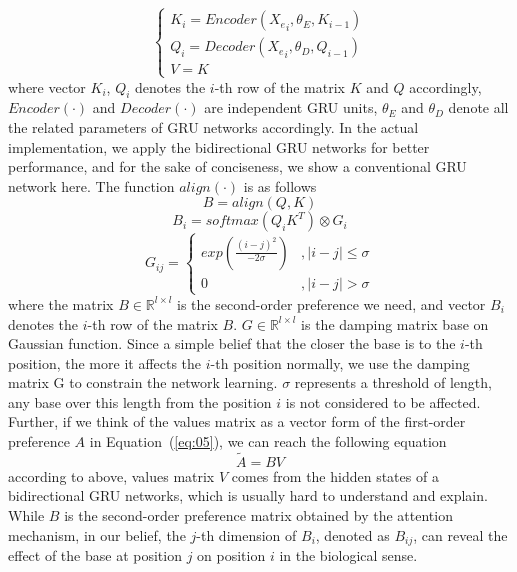 \documentclass{bioinfo}
\begin{document}
\begin{equation}
\left\{\begin{matrix}
K_i=Encoder({X_e}_i,\theta_E,K_{i-1})
\\ Q_i=Decoder({X_e}_i,\theta_D,Q_{i-1})
\\V=K 
\end{matrix}\right.\label{eq:14}
\end{equation}
where vector $K_i$, $Q_i$ denotes the $i$-th row of the matrix $K$ and $Q$ accordingly, $Encoder(\cdot)$ and $Decoder(\cdot)$ are independent GRU units, $\theta_E$ and $\theta_D$ denote all the related parameters of GRU networks accordingly. 
In the actual implementation, we apply the bidirectional GRU networks for better performance, and for the sake of conciseness, we show a conventional GRU network here. 
The function $align(\cdot)$ is as follows
\begin{equation}
B=align(Q,K)\label{eq:16}
\end{equation}
\begin{equation}
B_i=softmax(Q_iK^T)\otimes G_i\label{eq:17}
\end{equation}
\begin{equation}
G_{ij}=\left\{\begin{matrix}
exp(\frac{(i-j)^2}{-2\sigma})&,\left | i-j \right |\leqslant \sigma
\\ 0&,\left | i-j \right |>  \sigma
\end{matrix}\right.\label{eq:18}
\end{equation}
where the matrix $B\in\mathbb{R}^{l\times l}$ is the second-order preference we need, and vector $B_i$ denotes the $i$-th row of the matrix $B$. 
$G\in\mathbb{R}^{l\times l}$ is the damping matrix base on Gaussian function. 
Since a simple belief that the closer the base is to the $i$-th position, the more it affects the $i$-th position normally, we use the damping matrix G to constrain the network learning. 
$\sigma$ represents a threshold of length, any base over this length from the position $i$ is not considered to be affected.
Further, if we think of the values matrix as a vector form of the first-order preference $A$ in Equation~(\ref{eq:05}), we can reach the following equation
\begin{equation}
\tilde{A}=BV\label{eq:19}
\end{equation}
according to above, values matrix $V$ comes from the hidden states of a bidirectional GRU networks, which is usually hard to understand and explain.
While $B$ is the second-order preference matrix obtained by the attention mechanism, in our belief, the $j$-th dimension of $B_i$, denoted as $B_{ij}$, can reveal the effect of the base at position $j$ on position $i$ in the biological sense. 
\end{document}
